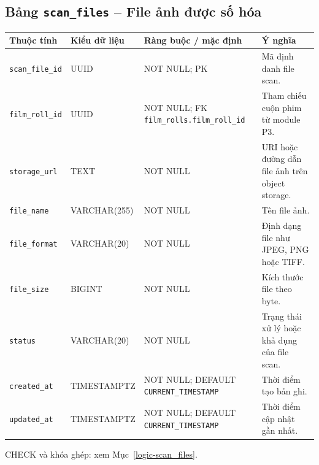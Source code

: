 \subsection{Bảng \texttt{scan\_\allowbreak{}files} -- File ảnh được số hóa}
\label{dictionary-scan_files}
\begingroup
\footnotesize
\setlength{\tabcolsep}{3pt}
\begin{longtable}{>{\raggedright\arraybackslash}p{3.1cm}>{\raggedright\arraybackslash}p{2.5cm}>{\raggedright\arraybackslash}p{3.7cm}>{\raggedright\arraybackslash}p{4.3cm}}
\toprule
Thuộc tính & Kiểu dữ liệu & Ràng buộc / mặc định & Ý nghĩa \\
\midrule
\endhead
\texttt{scan\_\allowbreak{}file\_\allowbreak{}id} & UUID & NOT NULL; PK & Mã định danh file scan. \\
\texttt{film\_\allowbreak{}roll\_\allowbreak{}id} & UUID & NOT NULL; FK \texttt{film\_\allowbreak{}rolls.film\_\allowbreak{}roll\_\allowbreak{}id} & Tham chiếu cuộn phim từ module P3. \\
\texttt{storage\_\allowbreak{}url} & TEXT & NOT NULL & URI hoặc đường dẫn file ảnh trên object storage. \\
\texttt{file\_\allowbreak{}name} & VARCHAR(255) & NOT NULL & Tên file ảnh. \\
\texttt{file\_\allowbreak{}format} & VARCHAR(20) & NOT NULL & Định dạng file như JPEG, PNG hoặc TIFF. \\
\texttt{file\_\allowbreak{}size} & BIGINT & NOT NULL & Kích thước file theo byte. \\
\texttt{status} & VARCHAR(20) & NOT NULL & Trạng thái xử lý hoặc khả dụng của file scan. \\
\texttt{created\_\allowbreak{}at} & TIMESTAMPTZ & NOT NULL; DEFAULT \texttt{CURRENT\_\allowbreak{}TIMESTAMP} & Thời điểm tạo bản ghi. \\
\texttt{updated\_\allowbreak{}at} & TIMESTAMPTZ & NOT NULL; DEFAULT \texttt{CURRENT\_\allowbreak{}TIMESTAMP} & Thời điểm cập nhật gần nhất. \\
\bottomrule
\end{longtable}
\endgroup
CHECK và khóa ghép: xem Mục~\ref{logic-scan_files}.
